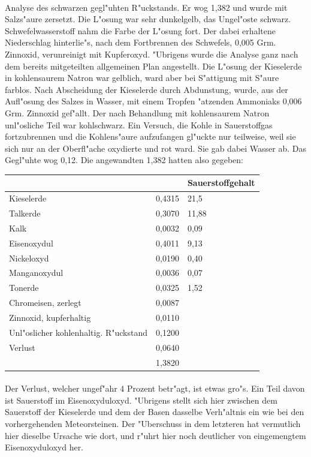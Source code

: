 \documentclass[a4paper, 11pt, oneside]{article}
\begin{document}
\paragraph{}
Analyse des schwarzen gegl"uhten R"uckstands. Er wog 1,382 und wurde mit Salzs"aure zersetzt. Die L"osung war sehr dunkelgelb, das Ungel"oste schwarz. Schwefelwasserstoff nahm die Farbe der L"osung fort. Der dabei erhaltene Niederschlag hinterlie"s, nach dem Fortbrennen des Schwefels, 0,005 Grm. Zinnoxid, verunreinigt mit Kupferoxyd. "Ubrigens wurde die Analyse ganz nach dem bereits mitgeteilten allgemeinen Plan angestellt. Die L"osung der Kieselerde in kohlensaurem Natron war gelblich, ward aber bei S"attigung mit S"aure farblos. Nach Abscheidung der Kieselerde durch Abdunstung, wurde, aus der Aufl"osung des Salzes in Wasser, mit einem Tropfen "atzenden Ammoniaks 0,006 Grm. Zinnoxid gef"allt. Der nach Behandlung mit kohlensaurem Natron unl"osliche Teil war kohlschwarz. Ein Versuch, die Kohle in Sauerstoffgas fortzubrennen und die Kohlens"aure aufzufangen gl"uckte nur teilweise, weil sie sich nur an der Oberfl"ache oxydierte und rot ward. Sie gab dabei Wasser ab. Das Gegl"uhte wog 0,12. Die angewandten 1,382 hatten also gegeben:
\begin{center}
\begin{tabular}{ |p{35mm}|p{20mm}|p{30mm}| }
    \hline
     &  & Sauerstoffgehalt\\\hline
    Kieselerde & 0,4315 & 21,5\\\hline
    Talkerde & 0,3070 & 11,88\\\hline
    Kalk & 0,0032 & 0,09\\\hline
    Eisenoxydul & 0,4011 & 9,13\\\hline
    Nickeloxyd & 0,0190 & 0,40\\\hline
    Manganoxydul & 0,0036 & 0,07\\\hline
    Tonerde & 0,0325 & 1,52\\\hline
    Chromeisen, zerlegt & 0,0087 & \\\hline
    Zinnoxid, kupferhaltig & 0,0110 & \\\hline
    Unl"oslicher kohlenhaltig. R"uckstand & 0,1200 & \\\hline
    Verlust & 0,0640 & \\\hline
     & 1,3820 & \\
    \hline
\end{tabular}
\end{center}
\paragraph{}
Der Verlust, welcher ungef"ahr 4 Prozent betr"agt, ist etwas gro"s. Ein Teil davon ist Sauerstoff im Eisenoxyduloxyd. "Ubrigens stellt sich hier zwischen dem Sauerstoff der Kieselerde und dem der Basen dasselbe Verh"altnis ein wie bei den vorhergehenden Meteorsteinen. Der "Uberschuss in dem letzteren hat vermutlich hier dieselbe Ursache wie dort, und r"uhrt hier noch deutlicher von eingemengtem Eisenoxyduloxyd her.
\end{document}
